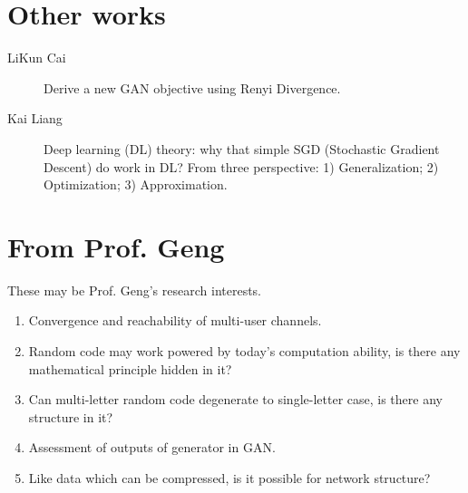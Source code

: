 \documentclass[12pt]{utils/mydoc}
\begin{document}
\section{Other works}

\begin{description}
  \item[LiKun Cai] Derive a new GAN objective using Renyi Divergence.
  \item[Kai Liang] Deep learning (DL) theory: why that simple SGD (Stochastic Gradient
    Descent) do work in DL? From three perspective: 1) Generalization; 2) Optimization;
    3) Approximation.
\end{description}

\section{From Prof. Geng}

These may be Prof. Geng's research interests.

\begin{enumerate}
  \item Convergence and reachability of multi-user channels.
  \item Random code may work powered by today's computation ability, is there any mathematical
    principle hidden in it?
  \item Can multi-letter random code degenerate to single-letter case, is there any structure
    in it?
  \item Assessment of outputs of generator in GAN.
  \item Like data which can be compressed, is it possible for network structure?
\end{enumerate}

%


\end{document}
